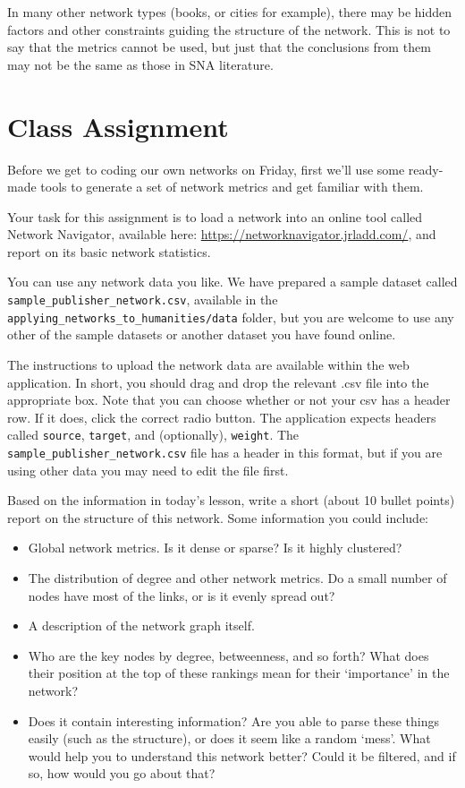 \documentclass[
]{book}
\providecommand{\tightlist}{%
  \setlength{\itemsep}{0pt}\setlength{\parskip}{0pt}}
\begin{document}
In many other network types (books, or cities for example), there may be hidden factors and other constraints guiding the structure of the network. This is not to say that the metrics cannot be used, but just that the conclusions from them may not be the same as those in SNA literature.

\hypertarget{class-assignment}{%
\section{Class Assignment}\label{class-assignment}}

Before we get to coding our own networks on Friday, first we'll use some ready-made tools to generate a set of network metrics and get familiar with them.

Your task for this assignment is to load a network into an online tool called Network Navigator, available here: \url{https://networknavigator.jrladd.com/}, and report on its basic network statistics.

You can use any network data you like. We have prepared a sample dataset called \texttt{sample\_publisher\_network.csv}, available in the \texttt{applying\_networks\_to\_humanities/data} folder, but you are welcome to use any other of the sample datasets or another dataset you have found online.

The instructions to upload the network data are available within the web application. In short, you should drag and drop the relevant .csv file into the appropriate box. Note that you can choose whether or not your csv has a header row. If it does, click the correct radio button. The application expects headers called \texttt{source}, \texttt{target}, and (optionally), \texttt{weight}. The \texttt{sample\_publisher\_network.csv} file has a header in this format, but if you are using other data you may need to edit the file first.

Based on the information in today's lesson, write a short (about 10 bullet points) report on the structure of this network. Some information you could include:

\begin{itemize}
\tightlist
\item
  Global network metrics. Is it dense or sparse? Is it highly clustered?
\item
  The distribution of degree and other network metrics. Do a small number of nodes have most of the links, or is it evenly spread out?\\
\item
  A description of the network graph itself.\\
\item
  Who are the key nodes by degree, betweenness, and so forth? What does their position at the top of these rankings mean for their `importance' in the network?
\item
  Does it contain interesting information? Are you able to parse these things easily (such as the structure), or does it seem like a random `mess'. What would help you to understand this network better? Could it be filtered, and if so, how would you go about that?
\end{itemize}
\end{document}
